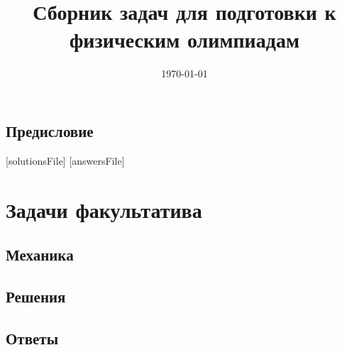 \documentclass[a5paper, oneside]{book}
\title{Сборник задач для подготовки к физическим олимпиадам}
\date{\today}
\begin{document}
\maketitle
\tableofcontents

\chapter*{Предисловие} 


[solutionsFile]
[answersFile]

\part{Задачи факультатива}

\chapter{Механика}



%



%
%
%
%
%
%
%
%
%
%


\chapter{Решения}

\chapter{Ответы}
\end{document}
